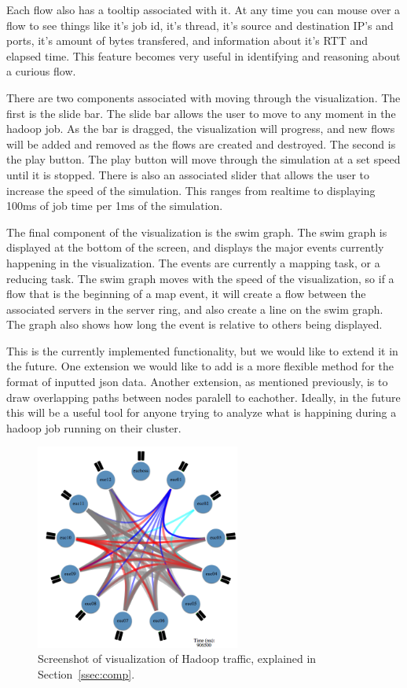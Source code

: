 Each flow also has a tooltip associated with it. At any time you can
mouse over a flow to see things like it's job id, it's thread, it's
source and destination IP's and ports, it's amount of bytes
transfered, and information about it's RTT and elapsed time. This
feature becomes very useful in identifying and reasoning about a
curious flow.

There are two components associated with moving through the
visualization. The first is the slide bar. The slide bar allows the
user to move to any moment in the hadoop job. As the bar is dragged,
the visualization will progress, and new flows will be added and
removed as the flows are created and destroyed. The second is the play
button. The play button will move through the simulation at a set
speed until it is stopped. There is also an associated slider that
allows the user to increase the speed of the simulation. This ranges
from realtime to displaying 100ms of job time per 1ms of the
simulation.

The final component of the visualization is the swim graph. The swim
graph is displayed at the bottom of the screen, and displays the major
events currently happening in the visualization. The events are
currently a mapping task, or a reducing task. The swim graph moves
with the speed of the visualization, so if a flow that is the
beginning of a map event, it will create a flow between the associated
servers in the server ring, and also create a line on the swim graph.
The graph also shows how long the event is relative to others being
displayed.

This is the currently implemented functionality, but we would like to
extend it in the future. One extension we would like to add is a more
flexible method for the format of inputted json data. Another
extension, as mentioned previously, is to draw overlapping paths
between nodes paralell to eachother. Ideally, in the future this will
be a useful tool for anyone trying to analyze what is happining during
a hadoop job running on their cluster.

\begin{figure}
\centering
\includegraphics[width=0.6\textwidth]{figures/hadoop-viz.png}
\caption{Screenshot of visualization of Hadoop traffic, explained in Section~\ref{ssec:comp}.}
\label{fig:viz}
\end{figure}
